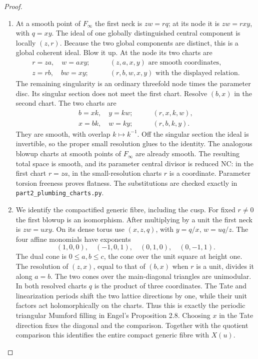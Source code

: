 \begin{proof}
\begin{enumerate}[label=\arabic*.,leftmargin=*]
\item At a smooth point of $F_\infty$ the first neck is $zw=rq$; at its node it is $zw=rxy$, with $q=xy$. The ideal of one globally distinguished central component is locally $(z,r)$. Because the two global components are distinct, this is a global coherent ideal. Blow it up. At the node its two charts are
\begin{align*}
 r=za,\quad w=axy;&\qquad (z,a,x,y)\text{ are smooth coordinates},\\
 z=rb,\quad bw=xy;&\qquad (r,b,w,x,y)\text{ with the displayed relation}.
\end{align*}
The remaining singularity is an ordinary threefold node times the parameter disc. Its singular section does not meet the first chart. Resolve $(b,x)$ in the second chart. The two charts are
\begin{align*}
 b=xk,\quad y=kw;&\qquad (r,x,k,w),\\
 x=bk,\quad w=ky;&\qquad (r,b,k,y).
\end{align*}
They are smooth, with overlap $k\mapsto k^{-1}$. Off the singular section the ideal is invertible, so the proper small resolution glues to the identity. The analogous blowup charts at smooth points of $F_\infty$ are already smooth. The resulting total space is smooth, and its parameter central divisor is reduced NC: in the first chart $r=za$, in the small-resolution charts $r$ is a coordinate. Parameter torsion freeness proves flatness. The substitutions are checked exactly in \texttt{part2\_plumbing\_charts.py}.

\item We identify the compactified generic fibre, including the cusp. For fixed $r\ne0$ the first blowup is an isomorphism. After multiplying by a unit the first neck is $zw=u xy$. On its dense torus use $(x,z,q)$, with $y=q/x$, $w=uq/z$. The four affine monomials have exponents
\[
 (1,0,0),\quad(-1,0,1),\quad(0,1,0),\quad(0,-1,1).
\]
The dual cone is $0\le a,b\le c$, the cone over the unit square at height one. The resolution of $(z,x)$, equal to that of $(b,x)$ when $r$ is a unit, divides it along $a=b$. The two cones over the main-diagonal triangles are unimodular. In both resolved charts $q$ is the product of three coordinates. The Tate and linearization periods shift the two lattice directions by one, while their unit factors act holomorphically on the charts. Thus this is exactly the periodic triangular Mumford filling in Engel's Proposition 2.8. Choosing $x$ in the Tate direction fixes the diagonal and the comparison. Together with the quotient comparison this identifies the entire compact generic fibre with $X(u)$.


\end{enumerate}
\end{proof}
